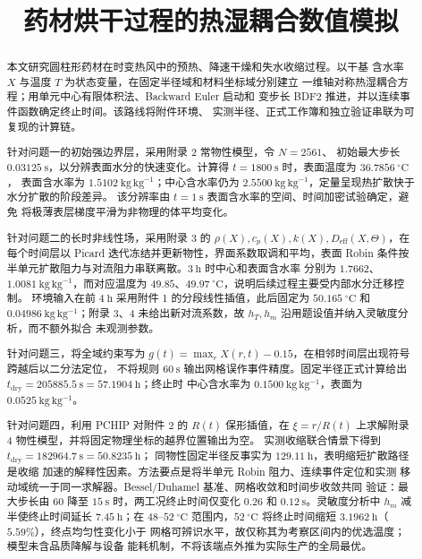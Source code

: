 \documentclass[withoutpreface,bwprint]{cumcmthesis}
\title{药材烘干过程的热湿耦合数值模拟}
\begin{document}
\maketitle

\begin{abstract}
  本文研究圆柱形药材在时变热风中的预热、降速干燥和失水收缩过程。以干基
  含水率 $X$ 与温度 $T$ 为状态变量，在固定半径域和材料坐标域分别建立
  一维轴对称热湿耦合方程；用单元中心有限体积法、Backward Euler 启动和
  变步长 BDF2 推进，并以连续事件函数确定终止时间。该路线将附件环境、
  实测半径、正式工作簿和独立验证串联为可复现的计算链。

  针对问题一的初始强边界层，采用附录 2 常物性模型，令 $N=2561$、
  初始最大步长 $0.03125\ \mathrm{s}$，以分辨表面水分的快速变化。计算得
  $t=1800\ \mathrm{s}$ 时，表面温度为 $36.7856\ ^\circ\mathrm{C}$，
  表面含水率为 $1.5102\ \mathrm{kg\,kg^{-1}}$；中心含水率仍为
  $2.5500\ \mathrm{kg\,kg^{-1}}$，定量呈现热扩散快于水分扩散的阶段差异。
  该分辨率由 $t=1\ \mathrm{s}$ 表面含水率的空间、时间加密试验确定，避免
  将极薄表层梯度平滑为非物理的体平均变化。

  针对问题二的长时非线性场，采用附录 3 的
  $\rho(X),c_p(X),k(X),D_{\mathrm{eff}}(X,\Theta)$，在每个时间层以
  Picard 迭代冻结并更新物性，界面系数取调和平均，表面 Robin 条件按
  半单元扩散阻力与对流阻力串联离散。$3\ \mathrm{h}$ 时中心和表面含水率
  分别为 $1.7662$、$1.0081\ \mathrm{kg\,kg^{-1}}$，而对应温度为
  $49.85$、$49.97\ ^\circ\mathrm{C}$，说明后续过程主要受内部水分迁移控制。
  环境输入在前 $4\ \mathrm{h}$ 采用附件 1 的分段线性插值，此后固定为
  $50.165\ ^\circ\mathrm{C}$ 和 $0.04986\ \mathrm{kg\,kg^{-1}}$；附录 3、4
  未给出新对流系数，故 $h_T,h_m$ 沿用题设值并纳入灵敏度分析，而不额外拟合
  未观测参数。

  针对问题三，将全域约束写为
  $g(t)=\max_rX(r,t)-0.15$，在相邻时间层出现符号跨越后以二分法定位，
  不将规则 $60\ \mathrm{s}$ 输出网格误作事件精度。固定半径正式计算给出
  $t_{\mathrm{dry}}=205885.5\ \mathrm{s}=57.1904\ \mathrm{h}$；终止时
  中心含水率为 $0.1500\ \mathrm{kg\,kg^{-1}}$，表面为 $0.0525\ \mathrm{kg\,kg^{-1}}$。

  针对问题四，利用 PCHIP 对附件 2 的 $R(t)$ 保形插值，在
  $\xi=r/R(t)$ 上求解附录 4 物性模型，并将固定物理坐标的越界位置输出为空。
  实测收缩联合情景下得到 $t_{\mathrm{dry}}=182964.7\ \mathrm{s}=50.8235\ \mathrm{h}$；
  同物性固定半径反事实为 $129.11\ \mathrm{h}$，表明缩短扩散路径是收缩
  加速的解释性因素。方法要点是将半单元 Robin 阻力、连续事件定位和实测
  移动域统一于同一求解器。Bessel/Duhamel 基准、网格收敛和时间步收敛共同
  验证：最大步长由 $60$ 降至 $15\ \mathrm{s}$ 时，两工况终止时间仅变化
  $0.26$ 和 $0.12\ \mathrm{s}$。灵敏度分析中 $h_m$ 减半使终止时间延长
  $7.45\ \mathrm{h}$；在 $48$--$52\ ^\circ\mathrm{C}$ 范围内，$52\ ^\circ\mathrm{C}$
  将终止时间缩短 $3.1962\ \mathrm{h}$（$5.59\%$），终点均匀性变化小于
  网格可辨识水平，故仅称其为考察区间内的优选温度；模型未含品质降解与设备
  能耗机制，不将该端点外推为实际生产的全局最优。

\end{abstract}
\end{document}
